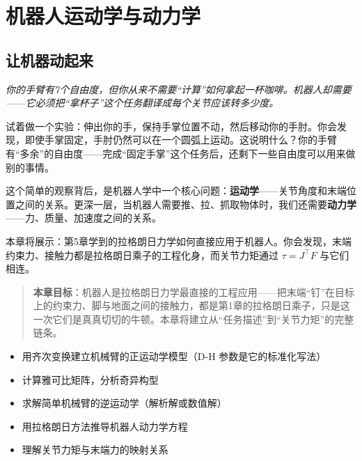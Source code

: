 \chapter{机器人运动学与动力学}

\section*{让机器动起来}


\vspace{0.5cm}
\noindent\textit{你的手臂有7个自由度，但你从来不需要“计算”如何拿起一杯咖啡。机器人却需要——它必须把“拿杯子”这个任务翻译成每个关节应该转多少度。}

试着做一个实验：伸出你的手，保持手掌位置不动，然后移动你的手肘。你会发现，即使手掌固定，手肘仍然可以在一个圆弧上运动。这说明什么？你的手臂有“多余”的自由度——完成“固定手掌”这个任务后，还剩下一些自由度可以用来做别的事情。

这个简单的观察背后，是机器人学中一个核心问题：\textbf{运动学}——关节角度和末端位置之间的关系。更深一层，当机器人需要推、拉、抓取物体时，我们还需要\textbf{动力学}——力、质量、加速度之间的关系。

本章将展示：第5章学到的拉格朗日力学如何直接应用于机器人。你会发现，末端约束力、接触力都是拉格朗日乘子的工程化身，而关节力矩通过 $\tau = J^\top F$ 与它们相连。

\begin{quote}
\textbf{本章目标}：机器人是拉格朗日力学最直接的工程应用——把末端“钉”在目标上的约束力、脚与地面之间的接触力，都是第1章的拉格朗日乘子，只是这一次它们是真真切切的牛顿。本章将建立从“任务描述”到“关节力矩”的完整链条。
\end{quote}

\begin{tcolorbox}[colback=green!5, colframe=green!60!black, title=学完这章，你将能够...]
\begin{itemize}
    \item 用齐次变换建立机械臂的正运动学模型（D-H 参数是它的标准化写法）
    \item 计算雅可比矩阵，分析奇异构型
    \item 求解简单机械臂的逆运动学（解析解或数值解）
    \item 用拉格朗日方法推导机器人动力学方程
    \item 理解关节力矩与末端力的映射关系
\end{itemize}
\end{tcolorbox}

